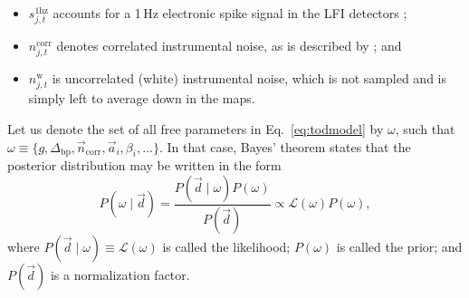 \documentclass[twocolumn]{aa}
\renewcommand{\d}[0]{\vec{d}}
\newcommand{\n}[0]{\vec{n}}
\renewcommand{\a}[0]{\vec{a}}
\newcommand{\Dbp}[0]{\Delta_{\mathrm{bp}}}
\begin{document}
\begin{itemize}
\item $s^{\mathrm{1hz}}_{j,t}$ accounts for a 1\,Hz electronic spike
  signal in the LFI detectors \citep{BP01};
  
\item $n^{\mathrm{corr}}_{j,t}$ denotes correlated instrumental noise, as is described by \citet{BP06}; and
  
\item $n^{\mathrm{w}}_{j,t}$ is uncorrelated (white) instrumental noise, which is not sampled and is simply left to average down in the maps.
\end{itemize}

Let us denote the set of all free parameters in Eq.~\eqref{eq:todmodel}
by $\omega$, such that $\omega\equiv\{g,\Dbp,\n_{\mathrm{corr}}, \a_i,
\beta_i,\ldots\}$. In that case, Bayes' theorem states that the
posterior distribution may be written in the form
\begin{equation}
  P(\omega\mid \d) = \frac{P(\d\mid \omega)P(\omega)}{P(\d)} \propto
  \mathcal{L}(\omega)P(\omega),
  \label{eq:jointpost}
\end{equation}
where $P(\d\mid \omega)\equiv\mathcal{L}(\omega)$ is called the
likelihood; $P(\omega)$ is called the prior; and $P(\d)$ is a
normalization factor.
\end{document}
